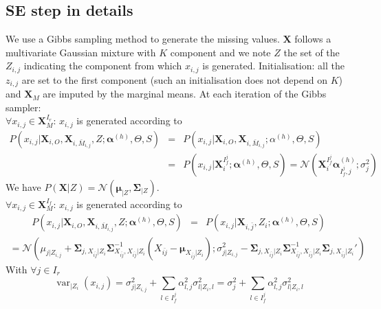 \documentclass[11pt,a4paper]{report}
\begin{document}
	\subsection{SE step in details}
		We use a Gibbs sampling method to generate the missing values. $\boldsymbol{X}$ follows a multivariate Gaussian mixture with $K$ component and we note $Z$ the set of the $Z_{i,j}$ indicating the component from which $x_{i,j}$ is generated.
		Initialisation: all the $z_{i,j}$ are set to the first component (such an initialisation does not depend on $K$) and $\boldsymbol{X}_M$ are imputed by the marginal means.
		At each iteration of the Gibbs sampler: \\
			$\forall x_{i,j} \in \boldsymbol{X}_M^{I_r}$:  $x_{i,j}$ is generated according to 
			\begin{eqnarray}
			P(x_{i,j}|\boldsymbol{X}_{i,O},\boldsymbol{X}_{i,\bar{M}_{i,j}},Z;\boldsymbol{\alpha}^{(h)},\Theta,S)&=&P(x_{i,j}|\boldsymbol{X}_{i,O},\boldsymbol{X}_{i,\bar{M}_{i,j}};\alpha^{(h)},\Theta,S) \\
			&=&P(x_{i,j}|\boldsymbol{X}_i^{I_f^j};\boldsymbol{\alpha}^{(h)},\Theta,S)=\mathcal{N}(\boldsymbol{X}_i^{I_f^j}\boldsymbol{\alpha}^{(h)}_{I_f^j,j};\sigma_j^2 )
			\end{eqnarray}		
			We have $P(\boldsymbol{X}|Z)=\mathcal{N}(\boldsymbol{\mu}_{|Z},\boldsymbol{\Sigma}_{|Z})$. \\
			$\forall x_{i,j} \in \boldsymbol{X}_M^{I_f}$:  $x_{i,j}$ is generated according to 
			\begin{eqnarray}
			P(x_{i,j}|\boldsymbol{X}_{i,O},\boldsymbol{X}_{i,\bar{M}_{i,j}},Z;\boldsymbol{\alpha}^{(h)},\Theta,S)&=&P(x_{i,j}|\boldsymbol{X}_{i,\bar{j}},Z_i;\boldsymbol{\alpha}^{(h)},\Theta,S)			\end{eqnarray}			
			\begin{eqnarray}
			=\mathcal{N}(\mu_{j|Z_{i,j}} + \boldsymbol{\Sigma}_{j,X_{\bar{ij}}|Z_i}\boldsymbol{\Sigma}^{-1}_{X_{\bar{ij}},X_{\bar{ij}}|Z_i}(X_{\bar{ij}}-\boldsymbol{\mu}_{X_{\bar{ij}}|Z_i}) ;  \sigma_{j|Z_{i,j}}^2-\boldsymbol{\Sigma}_{j,X_{\bar{ij}}|Z_i}\boldsymbol{\Sigma}^{-1}_{X_{\bar{ij}},X_{\bar{ij}}|Z_i}\boldsymbol{\Sigma}_{j,X_{\bar{ij}}|Z_i}')
			\end{eqnarray}		
With $\forall j \in I_r$ 
\begin{equation}
	\operatorname{var}_{|Z_{i}}(x_{i,j})=\sigma_{j|Z_{i,j}}^2+ \sum_{l \in I_f^j} \alpha_{l,j}^2\sigma_{l|Z_i,l}^2=\sigma_{j}^2+ \sum_{l \in I_f^j} \alpha_{l,j}^2\sigma_{l|Z_i,l}^2
\end{equation}			
\end{document}
